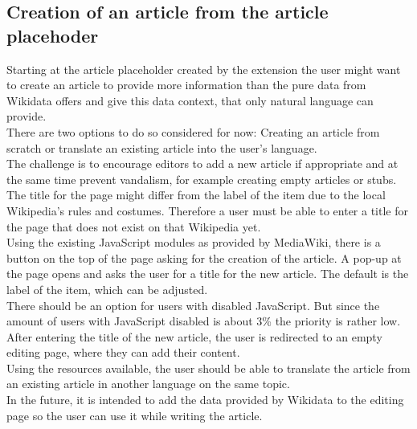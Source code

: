 \subsection{Creation of an article from the article placehoder}
Starting at the article placeholder created by the extension the user might want to create an article to provide more information than the pure data from Wikidata offers and give this data context, that only natural language can provide. \\
There are two options to do so considered for now: Creating an article from scratch or translate an existing article into the user's language. \\
The challenge is to encourage editors to add a new article if appropriate and at the same time prevent vandalism, for example creating empty articles or stubs.\\ 
The title for the page might differ from the label of the item due to the local Wikipedia's rules and costumes. Therefore a user must be able to enter a title for the page that does not exist on that Wikipedia yet. \\
Using the existing JavaScript modules as provided by MediaWiki, there is a button on the top of the page asking for the creation of the article. A pop-up at the page opens and asks the user for a title for the new article. The default is the label of the item, which can be adjusted. \\
There should be an option for users with disabled JavaScript. But since the amount of users with JavaScript disabled is about 3\% %
the priority is rather low. \\
After entering the title of the new article, the user is redirected to an empty editing page, where they can add their content. \\
Using the resources  available, the user should be able to translate the article from an existing article in another language on the same topic. \\
In the future, it is intended to add the data provided by Wikidata to the editing page so the user can use it while writing the article. 

